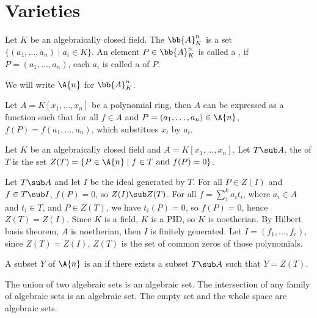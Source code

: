 \documentclass[10pt]{article}
\begin{document}
\def\htitle{Algebraic Geometry}
\def\hauthor{Hassium}
\hsetup
\htoc
\hmain
\section{Varieties}
\begin{definition}
    Let $K$ be an algebraically closed field. The  ${\bb{A}}_{K}^{n}$ is a set $\{({a}_{1},\dots,{a}_{n})\mid{a}_{i}\in K\}$. An element $P\in{\bb{A}}_{K}^{n}$ is called a , if $P=({a}_{1},\dots,{a}_{n})$, each ${a}_{i}$ is called a  of $P$.
\end{definition}
\begin{remark}
    We will write $\A{n}$ for ${\bb{A}}_{K}^{n}$.
\end{remark}
\par
Let $A=K[{x}_{1},\dots,{x}_{n}]$ be a polynomial ring, then $A$ can be expressed as a function such that for all $f\in A$ and $P=({a}_{1},\dots,{a}_{n})\in\A{n}$, $f(P)=f({a}_{1},\dots,{a}_{n})$, which substitues ${x}_{i}$ by ${a}_{i}$. 
\begin{definition}
    Let $K$ be an algebraically closed field and $A=K[{x}_{1},\dots,{x}_{n}]$. Let $T\sub A$, the  of $T$ is the set $Z(T)=\{P\in\A{n}\mid f\in T\ \text{and}\ f(P)=0\}$.
\end{definition}
\par
Let $T\sub A$ and let $I$ be the ideal generated by $T$. For all $P\in Z(I)$ and $f\in T\sub I$, $f(P)=0$, so $Z(I)\sub Z(T)$. For all $f={\sum}_{1}^{k}{a}_{i}{t}_{i}$, where ${a}_{i}\in A$ and ${t}_{i}\in T$, and $P\in Z(T)$, we have ${t}_{i}(P)=0$, so $f(P)=0$, hence $Z(T)=Z(I)$. Since $K$ is a field, $K$ is a PID, so $K$ is noetherian. By Hilbert basis theorem, $A$ is noetherian, then $I$ is finitely generated. Let $I=({f}_{1},\dots,{f}_{r})$, since $Z(T)=Z(I)$, $Z(T)$ is the set of common zeros of those polynomials.
\begin{definition}
    A subset $Y$ of $\A{n}$ is an  if there exists a subset $T\sub A$ such that $Y=Z(T)$.
\end{definition}
\begin{proposition}
    The union of two algebraic sets is an algebraic set. The intersection of any family of algebraic sets is an algebraic set. The empty set and the whole space are algebraic sets.
\end{proposition}
\end{document}
